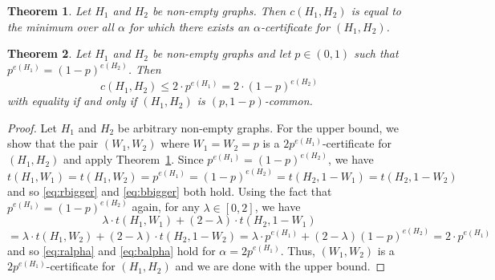 \documentclass[10pt,a4paper]{amsart}
\newtheorem{thm}{Theorem}
\begin{document}
\begin{thm}
\label{th:dual}
Let $H_1$ and $H_2$ be non-empty graphs. Then $c(H_1,H_2)$ is equal to the minimum over all $\alpha$ for which there exists an $\alpha$-certificate for $(H_1,H_2)$. 
\end{thm}

\begin{thm}
\label{th:commonPair}
Let $H_1$ and $H_2$ be non-empty graphs and let $p\in(0,1)$ such that $p^{e(H_1)}=(1-p)^{e(H_2)}$. Then
\[c(H_1,H_2)\leq 2\cdot p^{e(H_1)}=2\cdot(1-p)^{e(H_2)}\]
with equality if and only if $(H_1,H_2)$ is $(p,1-p)$-common. 
\end{thm}

\begin{proof}
Let $H_1$ and $H_2$ be arbitrary non-empty graphs. For the upper bound, we show that the pair $(W_1,W_2)$ where $W_1=W_2=p$ is a $2p^{e(H_1)}$-certificate for $(H_1,H_2)$ and apply Theorem~\ref{th:dual}. Since $p^{e(H_1)}=(1-p)^{e(H_2)}$, we have
\[t(H_1,W_1)=t(H_1,W_2)=p^{e(H_1)}=(1-p)^{e(H_2)}=t(H_2,1-W_1)=t(H_2,1-W_2)\]
and so \eqref{eq:rbigger} and \eqref{eq:bbigger} both hold. Using the fact that $p^{e(H_1)}=(1-p)^{e(H_2)}$ again, for any $\lambda\in[0,2]$, we have
\[\lambda\cdot t(H_1,W_1) + (2-\lambda)\cdot t(H_2,1-W_1)\]
\[=\lambda\cdot t(H_1,W_2) + (2-\lambda)\cdot t(H_2,1-W_2)= \lambda\cdot p^{e(H_1)}+ (2-\lambda)(1-p)^{e(H_2)} = 2\cdot p^{e(H_1)}\]
and so \eqref{eq:ralpha} and \eqref{eq:balpha} hold for $\alpha=2p^{e(H_1)}$. Thus, $(W_1,W_2)$ is a $2p^{e(H_1)}$-certificate for $(H_1, H_2)$ and we are done with the upper bound. 


\end{proof}
\end{document}
